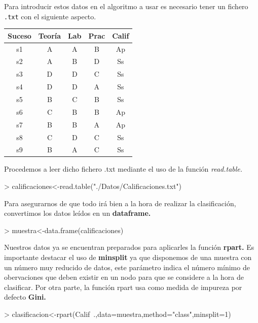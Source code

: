 \documentclass [a4paper] {article}
\begin{document}
\bigskip
Para introducir estos datos en el algoritmo a usar es necesario tener un fichero \texttt{.txt} con el
siguiente aspecto.
\begin{table}[H]
\begin{center}
\begin{tabular}{|c|c|c|c|c|}
\hline
Suceso & Teoría & Lab & Prac & Calif\\
\hline \hline
s1 & A & A & B & Ap \\ \hline
s2 & A & B & D & Ss \\ \hline
s3 & D & D & C & Ss \\ \hline
s4 & D & D & A & Ss \\ \hline
s5 & B & C & B & Ss \\ \hline
s6 & C & B & B & Ap \\ \hline
s7 & B & B & A & Ap \\ \hline
s8 & C & D & C & Ss \\ \hline
s9 & B & A & C & Ss \\ \hline
\end{tabular}
\end{center}
\end{table}

Procedemos a leer dicho fichero .txt mediante el uso de la función \textit{read.table.}
\begin{Schunk}
\begin{Sinput}
> calificaciones<-read.table("./Datos/Calificaciones.txt")
\end{Sinput}
\end{Schunk}

\bigskip
Para asegurarnos de que todo irá bien a la hora de realizar la clasificación, convertimos los datos
leídos en un \textbf{dataframe.}
\begin{Schunk}
\begin{Sinput}
> muestra<-data.frame(calificaciones)
\end{Sinput}
\end{Schunk}

\bigskip
Nuestros datos ya se encuentran preparados para aplicarles la función \textbf{rpart.} Es importante destacar
el uso de \textbf{minsplit} ya que disponemos de una muestra con un número muy reducido de datos, este parámetro indica
el número mínimo de obervaciones que deben existir en un nodo para que se considere a la hora de clasificar. 
Por otra parte, la función rpart usa como medida de impureza por defecto \textbf{Gini.}
\begin{Schunk}
\begin{Sinput}
> clasificacion<-rpart(Calif~.,data=muestra,method="class",minsplit=1)
\end{Sinput}
\end{Schunk}
\end{document}
